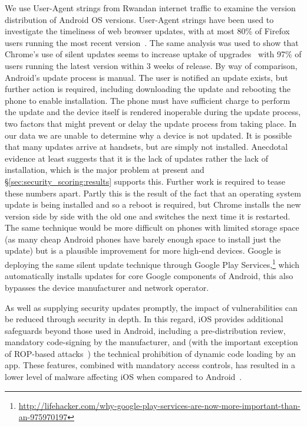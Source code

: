 \documentclass{sig-alternate-2013}
\begin{document}
We use User-Agent strings from Rwandan internet traffic to examine the version distribution of Android OS versions.
User-Agent strings have been used to investigate the timeliness of web browser updates, with at most 80\% of Firefox users running the most recent version~\cite{Frei2008}.
The same analysis was used to show that Chrome's use of silent updates seems to increase uptake of upgrades~\cite{Duebendorfer2010} with 97\% of users running the latest version within 3 weeks of release.
By way of comparison, Android's update process is manual.
The user is notified an update exists, but further action is required, including downloading the update and rebooting the phone to enable installation.
The phone must have sufficient charge to perform the update and the device itself is rendered inoperable during the update process, two factors that might prevent or delay the update process from taking place.
In our data we are unable to determine why a device is not updated. 
It is possible that many updates arrive at handsets, but are simply not installed.
Anecdotal evidence at least suggests that it is the lack of updates rather the lack of installation, which is the major problem at present and \S\ref{sec:security_scoring:results} supports this. Further work is required to tease these numbers apart.
Partly this is the result of the fact that an operating system update is being installed and so a reboot is required, but Chrome installs the new version side by side with the old one and switches the next time it is restarted.
The same technique would be more difficult on phones with limited storage space (as many cheap Android phones have barely enough space to install just the update) but is a plausible improvement for more high-end devices.
Google is deploying the same silent update technique through Google Play Services,\footnote{\href{http://lifehacker.com/why-google-play-services-are-now-more-important-than-an-975970197}{http://lifehacker.com/why-google-play-services-are-now-more-important-than-an-975970197}} which automatically installs updates for core Google components of Android, this also bypasses the device manufacturer and network operator.

As well as supplying security updates promptly, the impact of vulnerabilities can be reduced through security in depth.
In this regard, iOS provides additional safeguards beyond those used in Android, including a pre-distribution review, mandatory code-signing by the manufacturer, and (with the important exception of ROP-based attacks~\cite{Wang2013a}) the technical prohibition of dynamic code loading by an app.
These features, combined with mandatory access controls, has resulted in a lower level of malware affecting iOS when compared to Android~\cite{Felt2011}.
\end{document}
